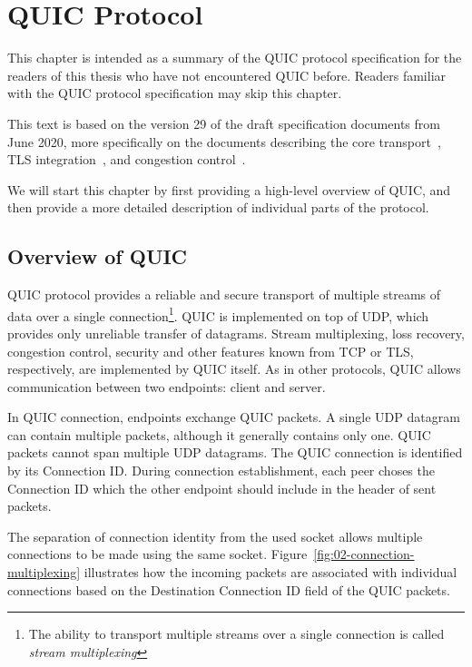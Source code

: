 
\chapter{QUIC Protocol}\label{chap:02-quic}

This chapter is intended as a summary of the QUIC protocol specification for the readers of this
thesis who have not encountered QUIC before. Readers familiar with the QUIC protocol specification
may skip this chapter.

This text is based on the version 29 of the draft specification documents from June 2020, more
specifically on the documents describing the core transport~\cite{draft-ietf-quic-transport}, TLS
integration~\cite{draft-ietf-quic-tls}, and congestion control~\cite{draft-ietf-quic-recovery}.

We will start this chapter by first providing a high-level overview of QUIC, and then provide a more
detailed description of individual parts of the protocol.

\section{Overview of QUIC}

QUIC protocol provides a reliable and secure transport of multiple streams of data over a single
connection\footnote{The ability to transport multiple streams over a single connection is called \textit{stream multiplexing}}. QUIC is implemented on top of UDP, which provides only unreliable transfer of datagrams.
Stream multiplexing, loss recovery, congestion control, security and other features known from TCP
or TLS, respectively, are implemented by QUIC itself. As in other protocols, QUIC allows
communication between two endpoints: client and server.

 In QUIC connection,
endpoints exchange QUIC packets. A single UDP datagram can contain multiple packets, although it
generally contains only one. QUIC packets cannot span multiple UDP datagrams. The QUIC connection is
identified by its Connection ID\@.  During connection establishment, each peer choses the Connection
ID which the other endpoint should include in the header of sent packets.

The separation of connection identity from the used socket allows multiple connections to be made
using the same socket. Figure~\ref{fig:02-connection-multiplexing} illustrates how the incoming
packets are associated with individual connections based on the Destination Connection ID field of
the QUIC packets.

